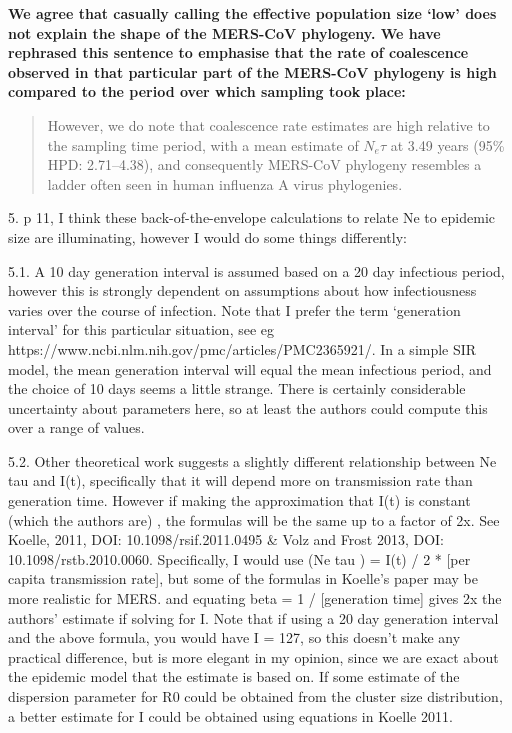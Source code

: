 \documentclass[11pt,oneside,letterpaper]{article}
\begin{document}
\textbf{We agree that casually calling the effective population size `low' does not explain the shape of the MERS-CoV phylogeny. We have rephrased this sentence to emphasise that the rate of coalescence observed in that particular part of the MERS-CoV phylogeny is high compared to the period over which sampling took place:}

\begin{quotation}
However, we do note that coalescence rate estimates are high relative to the sampling time period, with a mean estimate of $N_e\tau$ at 3.49 years (95\% HPD: 2.71--4.38), and consequently MERS-CoV phylogeny resembles a ladder often seen in human influenza A virus phylogenies.
\end{quotation}

5. p 11, I think these back-of-the-envelope calculations to relate Ne to epidemic size are illuminating, however I would do some things differently:

5.1. A 10 day generation interval is assumed based on a 20 day infectious period, however this is strongly dependent on assumptions about how infectiousness varies over the course of infection. Note that I prefer the term `generation interval' for this particular situation, see eg https://www.ncbi.nlm.nih.gov/pmc/articles/PMC2365921/. In a simple SIR model, the mean generation interval will equal the mean infectious period, and the choice of 10 days seems a little strange. There is certainly considerable uncertainty about parameters here, so at least the authors could compute this over a range of values.

\textbf{}

5.2. Other theoretical work suggests a slightly different relationship between Ne tau and I(t), specifically that it will depend more on transmission rate than generation time. However if making the approximation that I(t) is constant (which the authors are) , the formulas will be the same up to a factor of 2x. See Koelle, 2011, DOI: 10.1098/rsif.2011.0495 \& Volz and Frost 2013, DOI: 10.1098/rstb.2010.0060. Specifically, I would use (Ne tau ) = I(t) / 2 * [per capita transmission rate], but some of the formulas in Koelle's paper may be more realistic for MERS.
and equating beta = 1 / [generation time] gives 2x the authors' estimate if solving for I.
Note that if using a 20 day generation interval and the above formula, you would have I = 127, so this doesn't make any practical difference, but is more elegant in my opinion, since we are exact about the epidemic model that the estimate is based on. If some estimate of the dispersion parameter for R0 could be obtained from the cluster size distribution, a better estimate for I could be obtained using equations in Koelle 2011.
\end{document}
